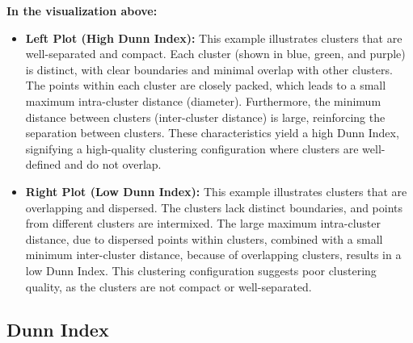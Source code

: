 \textbf{In the visualization above:}
\begin{itemize}
	\item \textbf{Left Plot (High Dunn Index):} This example illustrates clusters that are well-separated and compact. Each cluster (shown in blue, green, and purple) is distinct, with clear boundaries and minimal overlap with other clusters. The points within each cluster are closely packed, which leads to a small maximum intra-cluster distance (diameter). Furthermore, the minimum distance between clusters (inter-cluster distance) is large, reinforcing the separation between clusters. These characteristics yield a high Dunn Index, signifying a high-quality clustering configuration where clusters are well-defined and do not overlap.
	\item \textbf{Right Plot (Low Dunn Index):} This example illustrates clusters that are overlapping and dispersed. The clusters lack distinct boundaries, and points from different clusters are intermixed. The large maximum intra-cluster distance, due to dispersed points within clusters, combined with a small minimum inter-cluster distance, because of overlapping clusters, results in a low Dunn Index. This clustering configuration suggests poor clustering quality, as the clusters are not compact or well-separated.
\end{itemize}

\subsection{ Dunn Index}

